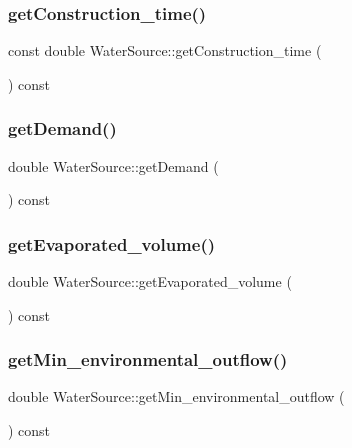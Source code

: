 \subsubsection{\texorpdfstring{get\+Construction\+\_\+time()}{getConstruction\_time()}}
{\footnotesize\ttfamily const double Water\+Source\+::get\+Construction\+\_\+time (\begin{DoxyParamCaption}{ }\end{DoxyParamCaption}) const}

\mbox{\label{classWaterSource_ac57d6b292490333b5bc14233bce326ce}} 
\subsubsection{\texorpdfstring{get\+Demand()}{getDemand()}}
{\footnotesize\ttfamily double Water\+Source\+::get\+Demand (\begin{DoxyParamCaption}{ }\end{DoxyParamCaption}) const}

\mbox{\label{classWaterSource_a00b156a153fc24097e4c8a4e5c46c4e0}} 
\subsubsection{\texorpdfstring{get\+Evaporated\+\_\+volume()}{getEvaporated\_volume()}}
{\footnotesize\ttfamily double Water\+Source\+::get\+Evaporated\+\_\+volume (\begin{DoxyParamCaption}{ }\end{DoxyParamCaption}) const}

\mbox{\label{classWaterSource_af7607924825ffe293179b09fe1bc466e}} 
\subsubsection{\texorpdfstring{get\+Min\+\_\+environmental\+\_\+outflow()}{getMin\_environmental\_outflow()}}
{\footnotesize\ttfamily double Water\+Source\+::get\+Min\+\_\+environmental\+\_\+outflow (\begin{DoxyParamCaption}{ }\end{DoxyParamCaption}) const}

